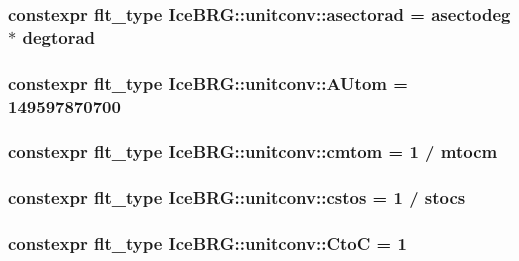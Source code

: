 \subsubsection[{asectorad}]{\setlength{\rightskip}{0pt plus 5cm}constexpr {\bf flt\+\_\+type} Ice\+B\+R\+G\+::unitconv\+::asectorad = {\bf asectodeg} $\ast$ {\bf degtorad}}\label{namespaceIceBRG_1_1unitconv_aac89183abac5a460b75c78424824797c}
\hypertarget{namespaceIceBRG_1_1unitconv_ab9543422c9eedb077e2696610d8698ea}{}
\subsubsection[{A\+Utom}]{\setlength{\rightskip}{0pt plus 5cm}constexpr {\bf flt\+\_\+type} Ice\+B\+R\+G\+::unitconv\+::\+A\+Utom = 149597870700}\label{namespaceIceBRG_1_1unitconv_ab9543422c9eedb077e2696610d8698ea}
\hypertarget{namespaceIceBRG_1_1unitconv_aed8caa21654848af6e1f08e0fe03da7b}{}
\subsubsection[{cmtom}]{\setlength{\rightskip}{0pt plus 5cm}constexpr {\bf flt\+\_\+type} Ice\+B\+R\+G\+::unitconv\+::cmtom = 1 / {\bf mtocm}}\label{namespaceIceBRG_1_1unitconv_aed8caa21654848af6e1f08e0fe03da7b}
\hypertarget{namespaceIceBRG_1_1unitconv_a640c49e0a9c2b9a2ce5a4036272541c0}{}
\subsubsection[{cstos}]{\setlength{\rightskip}{0pt plus 5cm}constexpr {\bf flt\+\_\+type} Ice\+B\+R\+G\+::unitconv\+::cstos = 1 / {\bf stocs}}\label{namespaceIceBRG_1_1unitconv_a640c49e0a9c2b9a2ce5a4036272541c0}
\hypertarget{namespaceIceBRG_1_1unitconv_a8cfff2b62437e07dd4e75260e1e5ce95}{}
\subsubsection[{Cto\+C}]{\setlength{\rightskip}{0pt plus 5cm}constexpr {\bf flt\+\_\+type} Ice\+B\+R\+G\+::unitconv\+::\+Cto\+C = 1}\label{namespaceIceBRG_1_1unitconv_a8cfff2b62437e07dd4e75260e1e5ce95}
\hypertarget{namespaceIceBRG_1_1unitconv_a53360211812748d35f99d2fa652b173b}{}
